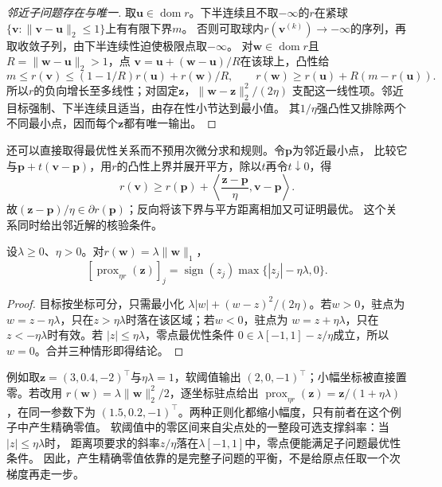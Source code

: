 \begin{proof}[邻近子问题存在与唯一]
取$\bm u\in\operatorname{dom}r$。下半连续且不取$-\infty$的$r$在紧球
$\{\bm v:\|\bm v-\bm u\|_2\leq1\}$上有有限下界$m$。
否则可取球内$r(\bm v^{(k)})\to-\infty$的序列，再取收敛子列，由下半连续性迫使极限点取$-\infty$。
对$\bm w\in\operatorname{dom}r$且$R=\|\bm w-\bm u\|_2>1$，点
$\bm v=\bm u+(\bm w-\bm u)/R$在该球上，凸性给
\[
 m\leq r(\bm v)\leq(1-1/R)r(\bm u)+r(\bm w)/R,
 \qquad
 r(\bm w)\geq r(\bm u)+R(m-r(\bm u)).
\]
所以$r$的负向增长至多线性；对固定$\bm z$，$\|\bm w-\bm z\|_2^2/(2\eta)$
支配这一线性项。邻近目标强制、下半连续且适当，由存在性小节达到最小值。
其$1/\eta$强凸性又排除两个不同最小点，因而每个$\bm z$都有唯一输出。
\end{proof}

还可以直接取得最优性关系而不预用次微分求和规则。令$\bm p$为邻近最小点，
比较它与$\bm p+t(\bm v-\bm p)$，用$r$的凸性上界并展开平方，除以$t$再令$t\downarrow0$，得
\[
 r(\bm v)\geq r(\bm p)+
 \left\langle\frac{\bm z-\bm p}{\eta},\bm v-\bm p\right\rangle.
\]
故$(\bm z-\bm p)/\eta\in\partial r(\bm p)$；反向将该下界与平方距离相加又可证明最优。
这个关系同时给出邻近解的核验条件。

\begin{theorem}
\label{thm:opt-soft-threshold}
设$\lambda\geq0$、$\eta>0$。对$r(\bm{w})=\lambda\lVert\bm{w}\rVert_1$，
\[
  [\operatorname{prox}_{\eta r}(\bm{z})]_j
  =\operatorname{sign}(z_j)\max\{|z_j|-\eta\lambda,0\}.
\]
\end{theorem}

\begin{proof}
目标按坐标可分，只需最小化
$\lambda|w|+(w-z)^2/(2\eta)$。若$w>0$，驻点为
$w=z-\eta\lambda$，只在$z>\eta\lambda$时落在该区域；若$w<0$，驻点为
$w=z+\eta\lambda$，只在$z<-\eta\lambda$时有效。若
$|z|\leq\eta\lambda$，零点最优性条件
$0\in\lambda[-1,1]-z/\eta$成立，所以$w=0$。合并三种情形即得结论。
\end{proof}

例如取$\bm z=(3,0.4,-2)^{\top}$与$\eta\lambda=1$，软阈值输出
$(2,0,-1)^{\top}$；小幅坐标被直接置零。若改用
$r(\bm w)=\lambda\lVert\bm w\rVert_2^2/2$，逐坐标驻点给出
$\operatorname{prox}_{\eta r}(\bm z)=\bm z/(1+\eta\lambda)$，在同一参数下为
$(1.5,0.2,-1)^{\top}$。两种正则化都缩小幅度，只有前者在这个例子中产生精确零值。
软阈值中的零区间来自尖点处的一整段可选支撑斜率：当$|z|\leq\eta\lambda$时，
距离项要求的斜率$z/\eta$落在$\lambda[-1,1]$中，零点便能满足子问题最优性条件。
因此，产生精确零值依靠的是完整子问题的平衡，不是给原点任取一个次梯度再走一步。



